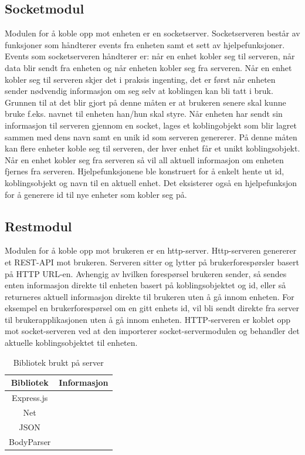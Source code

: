 \documentclass[12pt]{report}
\begin{document}
\subsection{Socketmodul}
Modulen for å koble opp mot enheten er en socketserver. Socketserveren består av funksjoner som håndterer events fra enheten samt et sett av hjelpefunksjoner. Events som socketserveren håndterer er: når en enhet kobler seg til serveren, når data blir sendt fra enheten og når enheten kobler seg fra serveren. Når en enhet kobler seg til serveren skjer det i praksis ingenting, det er først når enheten sender nødvendig informasjon om seg selv at koblingen kan bli tatt i bruk. Grunnen til at det blir gjort på denne måten er at brukeren senere skal kunne bruke f.eks. navnet til enheten han/hun skal styre. Når enheten har sendt sin informasjon til serveren gjennom en socket, lages et koblingobjekt som blir lagret sammen med dens navn samt en unik id som serveren genererer. På denne måten kan flere enheter koble seg til serveren, der hver enhet får et unikt koblingsobjekt. Når en enhet kobler seg fra serveren så vil all aktuell informasjon om enheten fjernes fra serveren. Hjelpefunksjonene ble konstruert for å enkelt hente ut id, koblingsobjekt og navn til en aktuell enhet. Det eksisterer også en hjelpefunksjon for å generere id til nye enheter som kobler seg på. 

\subsection{Restmodul}
Modulen for å koble opp mot brukeren er en http-server. Http-serveren genererer et REST-API mot brukeren. Serveren sitter og lytter på brukerforespørsler basert på HTTP URL-en. Avhengig av hvilken forespørsel brukeren sender, så sendes enten informasjon direkte til enheten basert på koblingsobjektet og id, eller så returneres aktuell informasjon direkte til brukeren uten å gå innom enheten. For eksempel en brukerforespørsel om en gitt enhets id, vil bli sendt direkte fra server til brukerapplikasjonen uten å gå innom enheten. HTTP-serveren er koblet opp mot socket-serveren ved at	den importerer socket-servermodulen og behandler det aktuelle koblingsobjektet til enheten.


\begin{table}[H]
	\begin{tabular}{|c|c|}
		\hline 
		\textbf{Bibliotek }& \textbf{Informasjon} \\ 
		\hline 
		Express.js &   \\ 
		\hline 
		Net &  \\ 
		\hline 
		JSON &  	\\ 
		\hline 
		BodyParser &  	\\  
		\hline 
	\end{tabular} 
	\centering
	\caption{Bibliotek brukt på server}
	\label{timing_4096}
\end{table}
\end{document}

